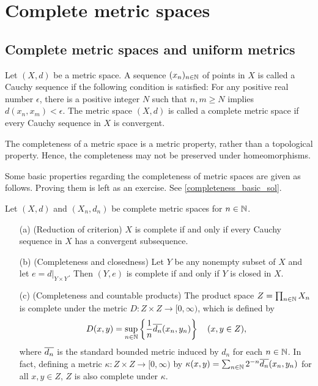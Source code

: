 \section{Complete metric spaces}

\subsection{Complete metric spaces and uniform metrics}

\begin{defi}
    Let $(X, d)$ be a metric space.
    A sequence $(x_n)_{n\in{\mathbb{N}}}$ of points in $X$ is called a Cauchy sequence if the following condition is satisfied: For any positive real number $\epsilon$, there is a positive integer $N$ such that $n, m\geq N$ implies $d(x_n, x_m)<\epsilon$.
    The metric space $(X, d)$ is called a complete metric space if every Cauchy sequence in $X$ is convergent.
\end{defi}
\begin{rmk}
    The completeness of a metric space is a metric property, rather than a topological property.
    Hence, the completeness may not be preserved under homeomorphisms.
\end{rmk}

Some basic properties regarding the completeness of metric spaces are given as follows.
Proving them is left as an exercise.
See \cref{completeness_basic_sol}.
\begin{prop}\label{completeness_basic}
    Let $(X, d)$ and $(X_n, d_n)$ be complete metric spaces for $n\in{\mathbb{N}}$.
    \begin{enumerate}
        \item[(a)]
        {
            (Reduction of criterion)
            $X$ is complete if and only if every Cauchy sequence in $X$ has a convergent subsequence.
        }
        \item[(b)]
        {
            (Completeness and closedness)
            Let $Y$ be any nonempty subset of $X$ and let $e=d|_{Y\times Y}$.
            Then $(Y, e)$ is complete if and only if $Y$ is closed in $X$.
        }
        \item[(c)]
        {
            (Completeness and countable products)
            The product space $Z=\prod_{n\in{\mathbb{N}}} X_n$ is complete under the metric $D: Z\times Z\rightarrow [0, \infty)$, which is defined by
            \begin{align*}
                D(x, y)=\sup_{n\in{\mathbb{N}}}\left\{\frac{1}{n}\overline{d_n}(x_n, y_n)\right\}
                \quad
                (x, y\in Z),
            \end{align*}
            where $\overline{d_n}$ is the standard bounded metric induced by $d_n$ for each $n\in{\mathbb{N}}$.
            In fact, defining a metric $\kappa: Z\times Z\rightarrow [0, \infty)$ by $\kappa(x, y)=\sum_{n\in{\mathbb{N}}} {2^{-n} \overline{d_n}(x_n, y_n)}$ for all $x, y\in Z$, $Z$ is also complete under $\kappa$.
        }
    \end{enumerate}
\end{prop}


